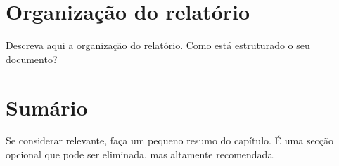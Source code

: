 \section{Organização do relatório}
\label{sec:intro_struct}

Descreva aqui a organização do relatório. Como está estruturado o seu documento?

\section*{Sumário}
\label{sec:intro_summary}
Se considerar relevante, faça um pequeno resumo do capítulo. É uma secção opcional que pode ser eliminada, mas altamente recomendada.
\\
\\
\\
\\
